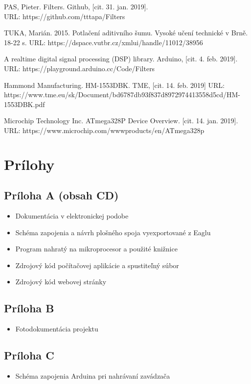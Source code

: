 \documentclass[titlepage,12pt]{article}
\begin{document}
\begin{enumerate}[label={[\arabic*]}]
\item PAS, Pieter. Filters. Github, [cit. 31. jan. 2019]. \\ URL: https://github.com/tttapa/Filters
\item TUKA, Marián. 2015. Potlačení aditivního šumu. Vysoké učení technické v Brně. \\ 18-22 s. URL: https://dspace.vutbr.cz/xmlui/handle/11012/38956
\item A realtime digital signal processing (DSP) library. Arduino, [cit. 4. feb. 2019]. \\ URL: https://playground.arduino.cc/Code/Filters
\item Hammond Manufacturing. HM-1553DBK. TME, [cit. 14. feb. 2019] URL: \\https://www.tme.eu/sk/Document/bd6787db93f837d8972974413558d5cd/HM-1553DBK.pdf
\item Microchip Technology Inc. ATmega328P Device Overview. [cit. 14. jan. 2019]. \\ URL: https://www.microchip.com/wwwproducts/en/ATmega328p
\end{enumerate}

\newpage
\section{Prílohy}
\subsection*{Príloha A (obsah CD)}
\begin{itemize}
	\item Dokumentácia v elektronickej podobe
	\item Schéma zapojenia a návrh plošného spoja vyexportované z Eaglu
	\item Program nahratý na mikroprocesor a použité knižnice
	\item Zdrojový kód počítačovej aplikácie a spustiteľný súbor
	\item Zdrojový kód webovej stránky
\end{itemize}
\subsection*{Príloha B}
\begin{itemize}
	\item Fotodokumentácia projektu
\end{itemize}
\subsection*{Príloha C}
\begin{itemize}
	\item Schéma zapojenia Arduina pri nahrávaní zavádzača
\end{itemize}
\end{document}
